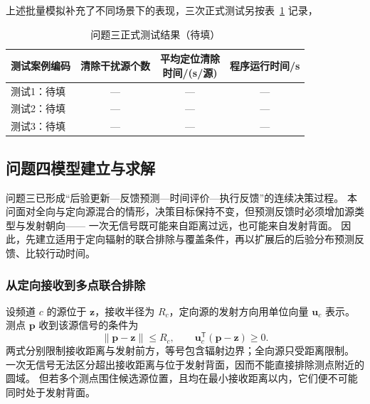 \documentclass[UTF8,a4paper,12pt]{ctexart}
\begin{document}
上述批量模拟补充了不同场景下的表现，三次正式测试另按表~\ref{tab:q3-official} 记录，

\begin{table}[!ht]
  \centering
  \caption{问题三正式测试结果（待填）}
  \label{tab:q3-official}
  \small
  \renewcommand{\arraystretch}{1.25}
  \begin{tabularx}{0.96\linewidth}{Xccc}
    \toprule
    测试案例编码 & 清除干扰源个数 & \shortstack{平均定位清除\\时间/(s/源)} & 程序运行时间/s \\
    \midrule
    测试1：待填 & --- & --- & --- \\
    测试2：待填 & --- & --- & --- \\
    测试3：待填 & --- & --- & --- \\
    \bottomrule
  \end{tabularx}
\end{table}
\FloatBarrier

\subsection{问题四模型建立与求解}
\label{sec:q4}

问题三已形成“后验更新—反馈预测—时间评价—执行反馈”的连续决策过程。
本问面对全向与定向源混合的情形，决策目标保持不变，但预测反馈时必须增加源类型与发射朝向——
一次无信号既可能来自距离过远，也可能来自发射背面。
因此，先建立适用于定向辐射的联合排除与覆盖条件，再以扩展后的后验分布预测反馈、比较行动时间。

\subsubsection{从定向接收到多点联合排除}

设频道 $c$ 的源位于 $\boldsymbol z$，接收半径为 $R_c$，定向源的发射方向用单位向量 $\boldsymbol u_c$ 表示。
测点 $\boldsymbol p$ 收到该源信号的条件为
\begin{equation}
  \|\boldsymbol p-\boldsymbol z\|\leq R_c,\qquad
  \boldsymbol u_c^{\mathsf T}(\boldsymbol p-\boldsymbol z)\geq0.
  \label{eq:q4-reception}
\end{equation}
两式分别限制接收距离与发射前方，等号包含辐射边界；全向源只受距离限制。
一次无信号无法区分超出接收距离与位于发射背面，因而不能直接排除测点附近的圆域。
但若多个测点围住候选源位置，且均在最小接收距离以内，它们便不可能同时处于发射背面。
\end{document}
